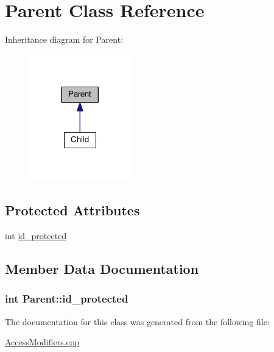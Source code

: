 \hypertarget{classParent}{}\section{Parent Class Reference}
\label{classParent}


Inheritance diagram for Parent\+:
\nopagebreak
\begin{figure}[H]
\begin{center}
\leavevmode
\includegraphics[width=125pt]{classParent__inherit__graph}
\end{center}
\end{figure}
\subsection*{Protected Attributes}
\begin{DoxyCompactItemize}
\item 
int \hyperlink{classParent_ae4415e6e7d3c3e06433ae19e1858fd45}{id\+\_\+protected}
\end{DoxyCompactItemize}


\subsection{Member Data Documentation}
\subsubsection[{\texorpdfstring{id\+\_\+protected}{id_protected}}]{\setlength{\rightskip}{0pt plus 5cm}int Parent\+::id\+\_\+protected\hspace{0.3cm}{\ttfamily [protected]}}\hypertarget{classParent_ae4415e6e7d3c3e06433ae19e1858fd45}{}\label{classParent_ae4415e6e7d3c3e06433ae19e1858fd45}


The documentation for this class was generated from the following file\+:\begin{DoxyCompactItemize}
\item 
\hyperlink{AccessModifiers_8cpp}{Access\+Modifiers.\+cpp}\end{DoxyCompactItemize}
